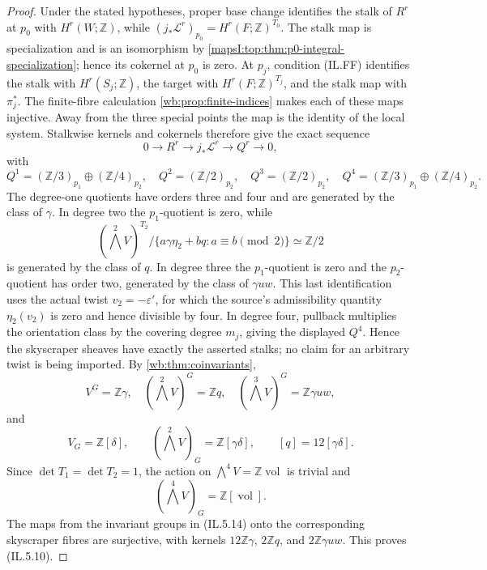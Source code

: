 \begin{proof}
Under the stated hypotheses, proper base change identifies the stalk of
\(R^r\) at \(p_0\) with \(H^r(W;\mathbb Z)\), while
\((j_*\mathcal L^r)_{p_0}=H^r(F;\mathbb Z)^{T_0}\).  The stalk map is
specialization and is an isomorphism by
\cref{mapsI:top:thm:p0-integral-specialization}; hence its cokernel at \(p_0\) is zero.
At \(p_j\), condition \textup{(IL.FF)} identifies the stalk with
\(H^r(S_j;\mathbb Z)\), the target with
\(H^r(F;\mathbb Z)^{T_j}\), and the stalk map with \(\pi_j^*\).  The
finite-fibre calculation \cref{wb:prop:finite-indices} makes each of these maps
injective.  Away from the three special points the map is the identity of
the local system.  Stalkwise kernels and cokernels therefore give the exact
sequence
\[
0\longrightarrow R^r\longrightarrow j_*\mathcal L^r
\longrightarrow Q^r\longrightarrow0,
\tag{IL.5.13}
\]
with
\[
Q^1=(\mathbb Z/3)_{p_1}\oplus(\mathbb Z/4)_{p_2},
\quad Q^2=(\mathbb Z/2)_{p_2},
\quad Q^3=(\mathbb Z/2)_{p_2},
\quad Q^4=(\mathbb Z/3)_{p_1}\oplus(\mathbb Z/4)_{p_2}.
\]
The degree-one quotients have orders three and four and are generated by the
class of \(\gamma\).  In degree two the \(p_1\)-quotient is zero, while
\[
 (\textstyle\bigwedge^2V)^{T_2}/
 \{a\gamma\eta_2+bq:a\equiv b\pmod2\}\simeq\mathbb Z/2
\]
is generated by the class of \(q\).  In degree three the \(p_1\)-quotient
is zero and the \(p_2\)-quotient has order two, generated by the class of
\(\gamma uw\).  This last identification uses the actual twist
\(v_2=-\varepsilon'\), for which the source's admissibility quantity
\(\eta_2(v_2)\) is zero and hence divisible by four.  In degree four,
pullback multiplies the orientation class by the covering
degree \(m_j\), giving the displayed \(Q^4\).  Hence the skyscraper sheaves
have exactly the asserted stalks; no claim for an arbitrary twist is being
imported.
By \cref{wb:thm:coinvariants},
\[
V^G=\mathbb Z\gamma,\quad
(\textstyle\bigwedge^2V)^G=\mathbb Zq,\quad
(\textstyle\bigwedge^3V)^G=\mathbb Z\gamma uw,
\tag{IL.5.14}
\]
and
\[
V_G=\mathbb Z[\delta],\qquad
(\textstyle\bigwedge^2V)_G=\mathbb Z[\gamma\delta],\qquad
[q]=12[\gamma\delta].
\tag{IL.5.15}
\]
Since \(\det T_1=\det T_2=1\), the action on
\(\bigwedge^4V=\mathbb Z\operatorname{vol}\) is trivial and
\[
 (\textstyle\bigwedge^4V)_G=\mathbb Z[\operatorname{vol}].
\tag{IL.5.15a}
\]
The maps from the invariant groups in (IL.5.14) onto the corresponding
skyscraper fibres are surjective, with kernels
\(12\mathbb Z\gamma\), \(2\mathbb Zq\), and
\(2\mathbb Z\gamma uw\).  This proves (IL.5.10).


\end{proof}
